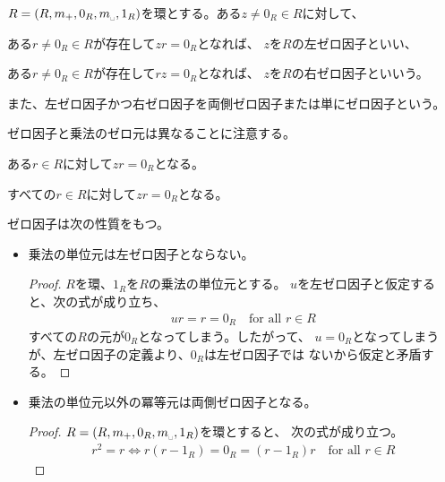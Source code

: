 	\begin{definition}\label{def:ゼロ因子} %
		$R=(R,m_+,0_R,m_\myspace,1_R)$を環とする。ある$z\neq0_R\in R$に対して、
		\begin{description}\setlength{\itemsep}{-1mm} %
			\item[左ゼロ因子] ある$r\neq0_R\in R$が存在して$zr=0_R$となれば、
			$z$を$R$の左ゼロ因子といい、
			\item[右ゼロ因子] ある$r\neq0_R\in R$が存在して$rz=0_R$となれば、
			$z$を$R$の右ゼロ因子といいう。
		\end{description} %
		また、左ゼロ因子かつ右ゼロ因子を両側ゼロ因子または単にゼロ因子という。
	\end{definition} %

	ゼロ因子と乗法のゼロ元は異なることに注意する。
	\begin{description}\setlength{\itemsep}{-1mm} %
		\item[ゼロ因子] ある$r\in R$に対して$zr=0_R$となる。
		\item[ゼロ元] すべての$r\in R$に対して$zr=0_R$となる。
	\end{description} %

	ゼロ因子は次の性質をもつ。
	\begin{itemize}\setlength{\itemsep}{-1mm} %
		\item 乗法の単位元は左ゼロ因子とならない。
		\begin{proof} $R$を環、$1_R$を$R$の乗法の単位元とする。
		$u$を左ゼロ因子と仮定すると、次の式が成り立ち、
		\begin{equation*}\begin{split}
			ur = r = 0_R \quad\text{for all }r\in R
		\end{split}\end{equation*}
		すべての$R$の元が$0_R$となってしまう。したがって、
		$u=0_R$となってしまうが、左ゼロ因子の定義より、$0_R$は左ゼロ因子では
		ないから仮定と矛盾する。
		\end{proof}
		\item 乗法の単位元以外の冪等元は両側ゼロ因子となる。
		\begin{proof} $R=(R,m_+,0_R,m_\myspace,1_R)$を環とすると、
		次の式が成り立つ。
		\begin{equation*}\begin{split}
			r^2 = r \iff r(r - 1_R) = 0_R = (r - 1_R)r
			\quad\text{for all }r\in R
		\end{split}\end{equation*}
		\end{proof}
	\end{itemize} %

